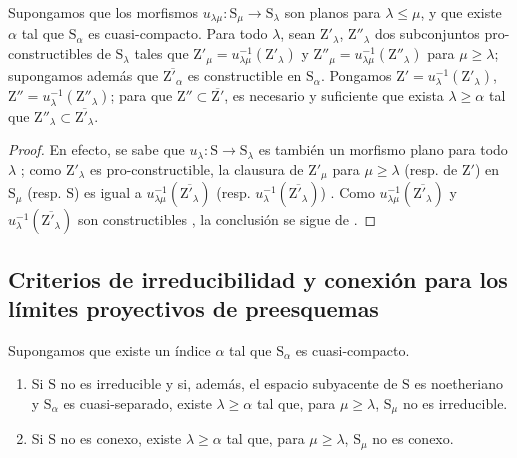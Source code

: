 \begin{proposition}[8.3.13]
\label{IV.8.3.13}
Supongamos que los morfismos $u_{\lambda\mu}:\mathrm{S}_\mu\to\mathrm{S}_\lambda$ son planos para $\lambda\leqslant\mu$, y que existe $\alpha$ tal que $\mathrm{S}_\alpha$ es cuasi-compacto.
Para todo $\lambda$, sean $\mathrm{Z}'_\lambda$, $\mathrm{Z}''_\lambda$ dos subconjuntos pro-constructibles de $\mathrm{S}_\lambda$ tales que $\mathrm{Z}'_\mu=u_{\lambda\mu}^{-1}(\mathrm{Z}'_\lambda)$ y $\mathrm{Z}''_\mu=u_{\lambda\mu}^{-1}(\mathrm{Z}''_\lambda)$ para $\mu\geqslant\lambda$; supongamos además que $\overline{\mathrm{Z}'_\alpha}$ es constructible en $\mathrm{S}_\alpha$.
Pongamos $\mathrm{Z}'=u_\lambda^{-1}(\mathrm{Z}'_\lambda)$, $\mathrm{Z}''=u_\lambda^{-1}(\mathrm{Z}''_\lambda)$; para que $\mathrm{Z}''\subset\overline{\mathrm{Z}'}$, es necesario y suficiente que exista $\lambda\geqslant\alpha$ tal que $\mathrm{Z}''_\lambda\subset\overline{\mathrm{Z}'_\lambda}$.
\end{proposition}

\begin{proof}
En efecto, se sabe que $u_\lambda:\mathrm{S}\to\mathrm{S}_\lambda$ es también un morfismo plano para todo $\lambda$ ; como $\mathrm{Z}'_\lambda$ es pro-constructible, la clausura de $\mathrm{Z}'_\mu$ para $\mu\geqslant\lambda$ (resp. de $\mathrm{Z}'$) en $\mathrm{S}_\mu$ (resp. $\mathrm{S}$) es igual a $u_{\lambda\mu}^{-1}(\overline{\mathrm{Z}'_\lambda})$ (resp. $u_\lambda^{-1}(\overline{\mathrm{Z}'_\lambda})$) .
Como $u_{\lambda\mu}^{-1}(\overline{\mathrm{Z}'_\lambda})$ y $u_\lambda^{-1}(\overline{\mathrm{Z}'_\lambda})$ son constructibles , la conclusión se sigue de .
\end{proof}

\subsection{Criterios de irreducibilidad y conexión para los límites proyectivos de preesquemas}
\label{subsection:IV.8.4}

\begin{proposition}[8.4.1]
\label{IV.8.4.1}
Supongamos que existe un índice $\alpha$ tal que $\mathrm{S}_\alpha$ es cuasi-compacto.
\begin{enumerate}[label=(\roman*)]
  \item Si $\mathrm{S}$ no es irreducible y si, además, el espacio subyacente de $\mathrm{S}$ es noetheriano y $\mathrm{S}_\alpha$ es cuasi-separado, existe $\lambda\geqslant\alpha$ tal que, para $\mu\geqslant\lambda$, $\mathrm{S}_\mu$ no es irreducible.
  \item Si $\mathrm{S}$ no es conexo, existe $\lambda\geqslant\alpha$ tal que, para $\mu\geqslant\lambda$, $\mathrm{S}_\mu$ no es conexo.
\end{enumerate}
\end{proposition}

